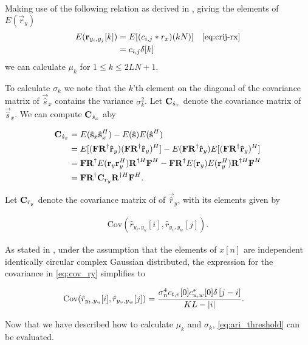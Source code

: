 \documentclass[a4paper, openany, oneside]{memoir}
\begin{document}
Making use of the following relation as derived in \cite{ariananda2012compressive}, giving  the elements of $E(\vec{r}_y)$ 
\begin{align*}
E(\vec{r}_{y_i, y_j}[k]) &= E[(c_{i,j} \ast r_x) (kN)] & \cref{eq:crij-rx} \\
&=  c_{i,j} \delta[k]
\end{align*}
we can calculate $\mu_k$ for $1 \leq k \leq 2LN+1$.

To calculate $\sigma_k$ we note that the $k$'th element on the diagonal of the covariance matrix of $\vec{\hat{s}}_x$ contains the variance $\sigma_k^2$. Let $\boldsymbol{\mathbf{C}}_{\hat{s}_x}$ denote the covariance matrix of $\vec{\hat{s}}_x$.  We can compute $\boldsymbol{\mathbf{C}}_{\hat{s}_x}$ aby

\begin{align}\label{eq:terror_cov_sx}
\boldsymbol{\mathbf{C}}_{\hat{s}_x} &= E(\boldsymbol{\mathbf{\hat{s}}}_x\boldsymbol{\mathbf{\hat{s}}}_x^H) - E(\boldsymbol{\mathbf{\hat{s}}})E(\boldsymbol{\mathbf{\hat{s}}}^H) \\
&= E[(\boldsymbol{\mathbf{F}} \boldsymbol{\mathbf{R}}^{\dagger}\boldsymbol{\mathbf{\hat{r}}}_y) ( \boldsymbol{\mathbf{F}}\boldsymbol{\mathbf{R}}^{\dagger}\boldsymbol{\mathbf{\hat{r}}}_y)^H] - E(\boldsymbol{\mathbf{F}}\boldsymbol{\mathbf{R}}^{\dagger}\boldsymbol{\mathbf{\hat{r}}}_y)E[(\boldsymbol{\mathbf{F}}\boldsymbol{\mathbf{R}}^{\dagger}\boldsymbol{\mathbf{\hat{r}}}_y)^H] \nonumber \\
&= \boldsymbol{\mathbf{F}}\boldsymbol{\mathbf{R}}^{\dagger} E(\boldsymbol{\mathbf{r}}_y\boldsymbol{\mathbf{r}}_y^H)  \boldsymbol{\mathbf{R}}^{\dagger H}\boldsymbol{\mathbf{F}}^H -  \boldsymbol{\mathbf{F}}\boldsymbol{\mathbf{R}}^{\dagger} E( \boldsymbol{\mathbf{r}}_y) E(\boldsymbol{\mathbf{r}}_y^H)  \boldsymbol{\mathbf{R}}^{\dagger H}\boldsymbol{\mathbf{F}}^H \nonumber \\
&= \boldsymbol{\mathbf{F}}\boldsymbol{\mathbf{R}}^{\dagger} \boldsymbol{\mathbf{C}}_{r_y} \boldsymbol{\mathbf{R}}^{\dagger H}\boldsymbol{\mathbf{F}}^H.\nonumber
\end{align}

Let $\boldsymbol{\mathbf{C}}_{\hat{r}_y}$ denote the covariance matrix of of $\vec{\hat{r}}_y$, with its elements given by

\begin{align}\label{eq:cov_ry}
\text{Cov}(\hat{r}_{y_t,y_u}[i],\hat{r}_{y_v, y_w}[j]).
\end{align}

As stated in \cite{ariananda2012compressive}, under the assumption that the elements of $x[n]$ are independent identically circular complex Gaussian distributed, the expression for the covariance in \cref{eq:cov_ry} simplifies to

\begin{align}\label{eq:elem_cov_ry}
\text{Cov}(\hat{r}_{y_t,y_u}[i],\hat{r}_{y_v, y_w}[j]) &= \frac{\sigma_n^4 c_{t,v}[0] c^*_{u,w}[0] \delta \left[ j-i\right]}{KL-|i|}.
\end{align}

Now that we have described how to calculate $\mu_k$ and $\sigma_k$, \cref{eq:ari_threshold} can be evaluated.
\end{document}
